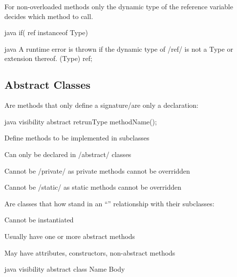 \begin{notebox}[Note]\nospacing
  For non-overloaded methods only the dynamic type of the reference variable
  decides which method to call.
\end{notebox}
\begin{codeboxNl}{java}
  if( ref instanceof Type)
\end{codeboxNl}
\begin{codeboxcomment}{0.3}{java}{
    A runtime error is thrown if the dynamic type of \javainline/ref/ is not a
    Type or extension thereof.
  }
  (Type) ref;
\end{codeboxcomment}
\subsection{Abstract Classes}
\begin{defnbox}\nospacing
  \begin{defn}
    Are methods that only define a signature/are only a declaration:
    \begin{mintlinebox}{java}
      visibility abstract retrunType methodName();
    \end{mintlinebox}
    \begin{itemizenosep}
        \item Define methods to be implemented in subclasses
        \item Can only be declared in \javainline/abstract/ classes
        \item Cannot be \javainline/private/ as private methods cannot be overridden
        \item Cannot be \javainline/static/ as static methods cannot be overridden
    \end{itemizenosep}
  \end{defn}
\end{defnbox}
\begin{defnbox}\nospacing
  \begin{defn}
    Are classes that how stand in an ``'' relationship with their subclasses:
    \begin{itemizenosep}
      \item Cannot be instantiated
      \item Usually have one or more abstract methods
      \item May have attributes, constructors, non-abstract methods 
    \end{itemizenosep}
    \begin{mintlinebox}{java}
      visibility abstract class Name{ Body }
    \end{mintlinebox}
  \end{defn}
\end{defnbox}
